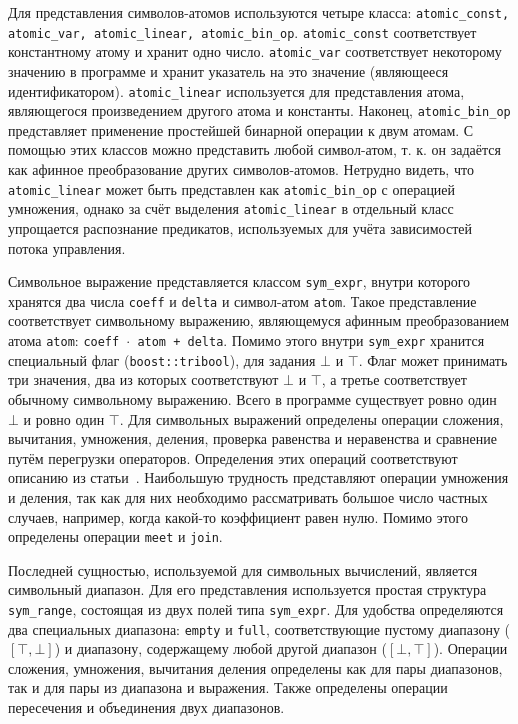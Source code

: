 Для представления символов-атомов используются четыре класса:
\texttt{atomic\_const, atomic\_var, atomic\_linear,
  atomic\_bin\_op}. \texttt{atomic\_const} соответствует константному
атому и хранит одно число. \texttt{atomic\_var} соответствует
некоторому значению в программе и хранит указатель на это значение
(являющееся идентификатором). \texttt{atomic\_linear} используется для
представления атома, являющегося произведением другого атома и
константы. Наконец, \texttt{atomic\_bin\_op} представляет применение
простейшей бинарной операции к двум атомам. С помощью этих классов
можно представить любой символ-атом, т. к. он задаётся как афинное
преобразование других символов-атомов. Нетрудно видеть, что
\texttt{atomic\_linear} может быть представлен как
\texttt{atomic\_bin\_op} с операцией умножения, однако за счёт выделения
\texttt{atomic\_linear} в отдельный класс упрощается распознание
предикатов, используемых для учёта зависимостей потока управления.

Символьное выражение представляется классом \texttt{sym\_expr}, внутри
которого хранятся два числа \texttt{coeff} и \texttt{delta} и
символ-атом \texttt{atom}. Такое представление соответствует
символьному выражению, являющемуся афинным преобразованием атома
\texttt{atom}: \texttt{coeff $\cdot$ atom + delta}. Помимо этого
внутри \texttt{sym\_expr} хранится специальный флаг
(\texttt{boost::tribool}), для задания $\bot$ и $\top$. Флаг может
принимать три значения, два из которых соответствуют $\bot$ и $\top$,
а третье соответствует обычному символьному выражению. Всего в
программе существует ровно один $\bot$ и ровно один $\top$. Для
символьных выражений определены операции сложения, вычитания,
умножения, деления, проверка равенства и неравенства и сравнение путём
перегрузки операторов. Определения этих операций соответствуют
описанию из статьи~\cite{li2010practical}. Наибольшую трудность
представляют операции умножения и деления, так как для них необходимо
рассматривать большое число частных случаев, например, когда какой-то
коэффициент равен нулю. Помимо этого определены операции \texttt{meet}
и \texttt{join}.

Последней сущностью, используемой для символьных вычислений, является
символьный диапазон. Для его представления используется простая
структура \texttt{sym\_range}, состоящая из двух полей типа
\texttt{sym\_expr}. Для удобства определяются два специальных
диапазона: \texttt{empty} и \texttt{full}, соответствующие пустому
диапазону ($[\top, \bot]$) и диапазону, содержащему любой другой
диапазон ($[\bot, \top]$). Операции сложения, умножения, вычитания
деления определены как для пары диапазонов, так и для пары из
диапазона и выражения. Также определены операции пересечения и
объединения двух диапазонов.

